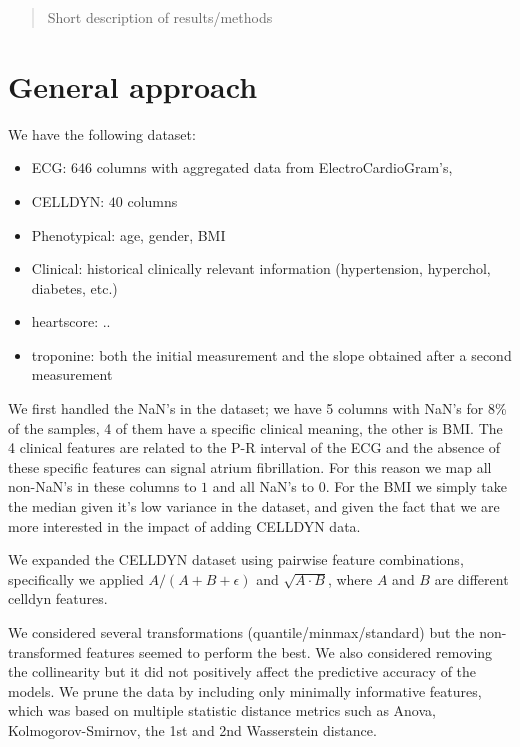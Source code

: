 \documentclass[a4paper,10pt]{article}
\title{}
\author{Bram van Es}
\begin{document}
\maketitle

\begin{abstract}
Short description of results/methods
\end{abstract}

\section{General approach}
%
We have the following dataset:
\begin{itemize}
 \item ECG: $646$ columns with aggregated data from ElectroCardioGram's, 
 \item CELLDYN: $40$ columns
 \item Phenotypical: age, gender, BMI
 \item Clinical: historical clinically relevant information (hypertension, hyperchol, diabetes, etc.)
 \item heartscore: ..
 \item troponine: both the initial measurement and the slope obtained after a second measurement
\end{itemize}

We first handled the NaN's in the dataset; we have 5 columns with NaN's for 8\% of the samples, 4 of them have a specific clinical meaning, the other is BMI. The 4 clinical features are related to the P-R interval of the ECG 
and the absence of these specific features can signal atrium fibrillation. For this reason we map
all non-NaN's in these columns to $1$ and all NaN's to $0$. For the BMI we simply take the median given it's low variance in the dataset, and given the fact that we are more interested in the impact of adding CELLDYN data. 

We expanded the CELLDYN dataset using pairwise feature combinations, specifically we applied
$A/(A+B+\epsilon)$ and $\sqrt{A\cdot B}$, where $A$ and $B$ are different celldyn features.

We considered several transformations (quantile/minmax/standard) but the non-transformed features seemed to perform
the best. We also considered removing the collinearity but it did not positively affect the predictive accuracy
of the models. We prune the data by including only minimally informative features, which was based on multiple statistic distance metrics such as Anova, Kolmogorov-Smirnov, the 1st and 2nd Wasserstein distance.
%
\end{document}
